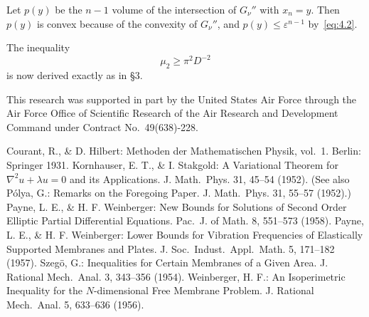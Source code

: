 \documentclass{article}
\theoremstyle{remarks}
\begin{document}
Let $p(y)$ be the $n-1$ volume of the intersection of $G_\nu''$
with $x_n=y$. Then $p(y)$ is convex because of the convexity of $G_\nu''$,
and $p(y)\leq \varepsilon^{n-1}$ by~\eqref{eq:4.2}.

The inequality
\begin{equation}\label{eq:4.3}
  \mu_2 \geq \pi^2 D^{-2}
\end{equation}
is now derived exactly as in \S3.

{\small This research was supported in part by the United States Air Force
through the Air Force Office of Scientific Research of the Air Research
and Development Command under Contract No.~49(638)-228.}


\begin{thebibliography}{6}
   Courant, R., \& D. Hilbert: Methoden der Mathematischen Physik,
    vol.~1. Berlin: Springer 1931.
   Kornhauser, E. T., \& I. Stakgold: A Variational Theorem for
    $\nabla^2 u+\lambda u = 0$ and its Applications. J. Math.~Phys. 31, 45--54 (1952).
    (See also P\'olya, G.: Remarks on the Foregoing Paper. J. Math.~Phys. 31, 55--57 (1952).)
   Payne, L. E., \& H. F. Weinberger: New Bounds for Solutions of Second
    Order Elliptic Partial Differential Equations. Pac.~J. of Math. 8, 551--573 (1958).
   Payne, L. E., \& H. F. Weinberger: Lower Bounds for Vibration Frequencies
    of Elastically Supported Membranes and Plates. J. Soc.~Indust.~Appl.~Math. 5, 171--182 (1957).
   Szeg\"o, G.: Inequalities for Certain Membranes of a Given Area.
    J. Rational Mech.\ Anal. 3, 343--356 (1954).
   Weinberger, H. F.: An Isoperimetric Inequality for the $N$-dimensional
    Free Membrane Problem. J. Rational Mech.\ Anal. 5, 633--636 (1956).
\end{thebibliography}
\end{document}
